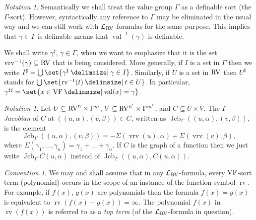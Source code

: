 \documentclass[12pt]{amsart}
\newcommand{\memph}[1]{{\color{magenta}\emph{#1}}}
\theoremstyle{plain}
\theoremstyle{definition}
\theoremstyle{remark}
\newtheorem{nota}[thm]{Notation}
\newtheorem{conv}[thm]{Convention}
\numberwithin{equation}{section}
\theoremstyle{plain}
\newcommand{\VF}{\textup{VF}}
\newcommand{\RV}{\textup{RV}}
\DeclareMathOperator{\jcb}{Jcb}
\newcommand{\0}{\emptyset}
\newcommand{\lan}[3]{\mathcal{L}_{#1 \textup{#2} #3}}
\newcommand{\sub}{\subseteq}
\providecommand\given{}
\newcommand\SetSymbol[1][]{%
\nonscript \: #1 \vert
\allowbreak
\nonscript\:
\mathopen{}}
\renewcommand\given{\SetSymbol[\delimsize]}
\DeclareMathOperator{\rv}{rv}
\DeclareMathOperator{\vv}{val}
\DeclareMathOperator{\vrv}{vrv}
\begin{document}
\begin{nota}\label{gamwhat}
Semantically we shall treat the value group $\Gamma$ as a definable sort (the $\Gamma$-sort). However, syntactically any reference to $\Gamma$ may be eliminated in the usual way and we can still work with $\lan{}{RV}{}$-formulas for the same purpose. This implies that $\gamma\in \Gamma$ is definable means that $\vv^{-1}(\gamma)$ is definable.

We shall write $\gamma^\sharp$, $\gamma \in \Gamma$, when we want to emphasize that it is the set $\vrv^{-1}(\gamma) \sub \RV$  that is being considered. More generally, if $I$ is a set in $\Gamma$ then we write $I^\sharp = \bigcup\set{\gamma^\sharp \given \gamma \in I}$. Similarly, if $U$ is a set in $\RV$ then $U^\sharp$ stands for $\bigcup\set{\rv^{-1}(t) \given t \in U}$. In particular, $\gamma^{\sharp \sharp}=\set{ x \in \VF \given \vv(x)=\gamma}$.
\end{nota}


\begin{nota}\label{jcbG:op}
Let $U \sub \RV^n \times \Gamma^m$, $V \sub \RV^{n'} \times \Gamma^{m'}$, and $C \sub U \times V$. The \memph{$\Gamma$-Jacobian} of $C$ at $((u, \alpha), (v, \beta)) \in C$, written as $\jcb_{\Gamma} ((u, \alpha), (v, \beta))$, is the element
\[
\jcb_{\Gamma} ((u, \alpha), (v, \beta)) =  - \Sigma (\vrv(u), \alpha) + \Sigma (\vrv(v), \beta),
\]
where $\Sigma (\gamma_1, \ldots, \gamma_n) = \gamma_1 + \ldots + \gamma_n$. If $C$ is the graph of a function then we just write $\jcb_{\Gamma}C(u, \alpha)$ instead of $\jcb_\Gamma((u, \alpha), C(u, \alpha))$.
\end{nota}


%

\begin{conv}\label{topterm}
We may and shall assume that in any $\lan{}{RV}{}$-formula, every $\VF$-sort term (polynomial) occurs in the scope of an instance of the function symbol $\rv$. For example, if $f(x)$, $g(x)$ are polynomials then the formula $f(x) = g(x)$ is equivalent to $\rv(f(x) - g(x)) = \infty$. The polynomial $f(x)$ in $\rv(f(x))$ is referred to as a \memph{top term} (of the $\lan{}{RV}{}$-formula in question).
\end{conv}
\end{document}

